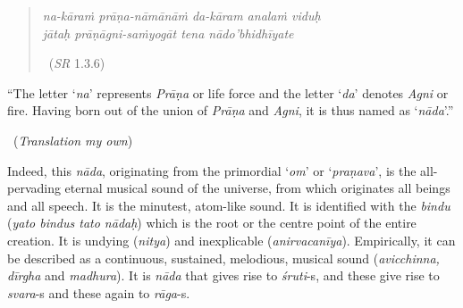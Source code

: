 \begin{verse}
\textit{na-kāraṁ prāṇa-nāmānāṁ da-kāram analaṁ viduḥ }\\ \textit{jātaḥ prāṇāgni-saṁyogāt tena nādo’bhidhīyate } 

~\hfill (\textit{SR} 1.3.6)
\end{verse}

\begin{myquote}
“The letter ‘\textit{na}’ represents \textit{Prāṇa} or life force and the letter ‘\textit{da}’ denotes \textit{Agni} or fire. Having born out of the union of \textit{Prāṇa} and \textit{Agni}, it is thus named as ‘\textit{nāda}’.” 

~\hfill (\textit{Translation my own})
\end{myquote}

Indeed, this \textit{nāda}, originating from the primordial ‘\textit{om}’ or ‘\textit{praṇava}’, is the all-pervading eternal musical sound of the universe, from which originates all beings and all speech. It is the minutest, atom-like sound. It is identified with the \textit{bindu} (\textit{yato bindus tato nādaḥ}) which is the root or the centre point of the entire creation. It is undying (\textit{nitya}) and inexplicable (\textit{anirvacanīya}). Empirically, it can be described as a continuous, sustained, melodious, musical sound (\textit{avicchinna, dīrgha} and \textit{madhura}). It is \textit{nāda} that gives rise to \textit{śruti}-s, and these give rise to \textit{svara}-s and these again to \textit{rāga}-s.

